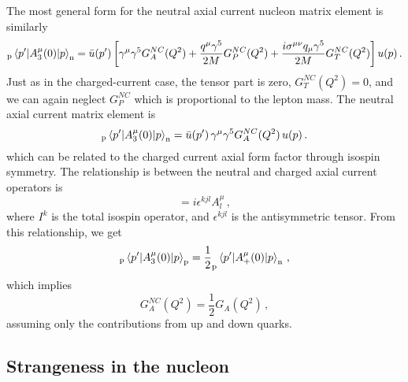     The most general form for the neutral axial current nucleon matrix element
    is similarly
    \begin{equation}
      _{\textrm{p}}\mel{p'}{A^{\mu}_3(0)}{p}_{\textrm{n}} 
        = \bar{u}(p') \left[\gamma^{\mu}\gamma^{5} G_A^{NC}(Q^2) 
          + \frac{q^{\mu}\gamma^{5}}{2M}G_P^{NC}(Q^2) 
          + \frac{i\sigma^{\mu\nu}q_{\mu}\gamma^{5}}{2M}G_T^{NC}(Q^2)\right] u(p) \,.
    \end{equation}
    Just as in the charged-current case, the tensor part is zero, $G_T^{NC}(Q^2) =
    0$, and we can again neglect $G_P^{NC}$ which is proportional to the lepton
    mass. The neutral axial current matrix element is
    \begin{equation}
      _{\textrm{p}}\mel{p'}{A^{\mu}_3(0)}{p}_{\textrm{n}} 
        = \bar{u}(p') \,\gamma^{\mu}\gamma^{5} G_A^{NC}(Q^2)\, u(p) \,.
    \end{equation}
    which can be related to the charged current axial form factor through
    isospin symmetry.  The relationship is between the neutral and charged
    axial current operators is
    \begin{equation}
      [I^k,A_j^{\mu}] = i\epsilon^{kjl}A^{\mu}_l \,,
    \end{equation}
    where $I^k$ is the total isospin operator, and $\epsilon^{kjl}$ is the
    antisymmetric tensor. From this relationship, we get
    \begin{equation}
      _{\textrm{p}}\mel{p'}{A^{\mu}_3(0)}{p}_{\textrm{p}}
       = \frac{1}{2}_{\textrm{p}}\mel{p'}{A^{\mu}_+(0)}{p}_{\textrm{n}}\,,
    \end{equation}
    which implies
    \begin{equation}
      G_A^{NC}(Q^2) = \frac{1}{2}G_A(Q^2) \,,
    \end{equation}
    assuming only the contributions from up and down quarks.

\subsection{Strangeness in the nucleon} \label{sec:strangeness}

